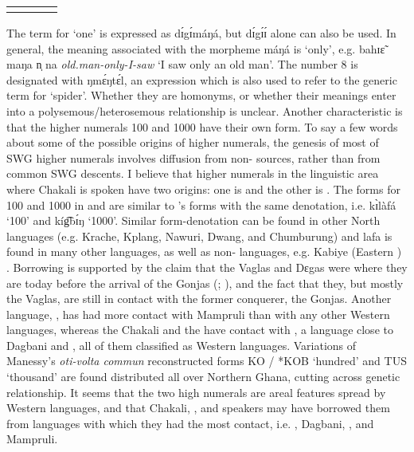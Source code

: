 \begin{exe}
\begin{exe}
\begin{exe}
\begin{exe}
\begin{exe}
\begin{exe}
\begin{exe}
\begin{exe}
\begin{exe}
\begin{exe}
\begin{table}
\begin{tabular}{llll}
\lspbottomrule
\end{tabular}
\end{table}

The term for `one'  is expressed  as  {\sls dɪ́gɪ́máŋá},  but  {\sls dɪ́gɪ́ɪ́} alone  can also be used. In general, the meaning associated with the morpheme {\sls máŋá} is `only', e.g.  {\sls bahɪɛ̃ maŋa n̩ na} {\it old.man-only-I-saw} `I saw only an old man'. The number 8 is designated with  {\sls ŋmɛ́ŋtɛ́l}, an expression which is also used to refer to the generic term for  `spider'.  Whether they are homonyms, or whether their meanings enter into a polysemous/heterosemous relationship is unclear. Another characteristic is that the higher numerals 100 and 1000  have their own  form. To say a few words about some of the possible origins of higher numerals, the genesis of most of SWG higher numerals involves diffusion from non- sources, rather than from  common SWG descents. I believe that higher numerals in the linguistic area where Chakali is spoken have two origins: one is  and the other is . The  forms for 100 and 1000  in  and   are similar to 's forms with the same denotation, i.e.  {\sls  kɪ̀làfá} `100' and  {\sls  kíg͡bɪ́ŋ} `1000'.  Similar form-denotation can be found in other North  languages (e.g. Krache, Kplang, Nawuri, Dwang, and Chumburung) and {\sls lafa} is found in many other  languages, as well as  non- languages, e.g. Kabiye (Eastern )  \citep{Chan09}. Borrowing is  supported by the claim that the Vaglas and Dɛgas were where they are today before the arrival of the Gonjas (\citealt[12-13]{Good54}; \citealt[516]{Ratt32a}), and the fact that they, but mostly the Vaglas, are still in contact with the former conquerer, the Gonjas. Another  language, , has had more contact with Mampruli than with any other Western  languages, whereas the Chakali and the  have contact with , a language close to  Dagbani and , all of them classified as Western   languages. Variations of Manessy's {\it oti-volta commun} reconstructed forms {\sls *KO / *KOB}  `hundred'  and {\sls *TUS}  `thousand'  are found distributed all over Northern Ghana, cutting across genetic relationship.  It seems that the two high numerals are areal features spread by Western   languages,   and that Chakali, , and  speakers may  have borrowed them from languages with which they had the most contact, i.e.   , Dagbani, ,  and Mampruli.


\end{exe}
\end{exe}
\end{exe}
\end{exe}
\end{exe}
\end{exe}
\end{exe}
\end{exe}
\end{exe}
\end{exe}
